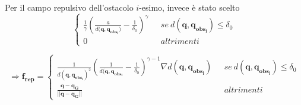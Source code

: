 Per il campo repulsivo dell'ostacolo $i$-esimo, invece è stato scelto
\begin{equation}
  \begin{cases}
    \frac{1}{\gamma} (\frac{a}{d( \boldsymbol{q},  \boldsymbol{q_{obs_i})}} - \frac{1}{\delta_0})^\gamma \: \: \:  & se \: d( \boldsymbol{q},  \boldsymbol{q_{obs_i}}) \leq \delta_0 \\
    0  \: \: \:  & altrimenti
  \end{cases} 
\end{equation}
  

\begin{equation*}
\Rightarrow \boldsymbol{f_{rep}} = 
\begin{cases}

  \frac{1}{d( \boldsymbol{q},  \boldsymbol{q_{obs_i}} )^2} ( \frac{1}{d( \boldsymbol{q},  \boldsymbol{q_{obs_i}}} - \frac{1}{\delta_0})^{\gamma -1} \nabla d( \boldsymbol{q},  \boldsymbol{q_{obs_i}} )   \: \: \: & se \: d( \boldsymbol{q},  \boldsymbol{q_{obs_i}} ) \leq \delta_0 
   \\
\frac{ \boldsymbol{q} - \boldsymbol{q_G}}{|| \boldsymbol{q} - \boldsymbol{q_G}||} \: \: \:  & altrimenti
  \end{cases} 
\end{equation*}

